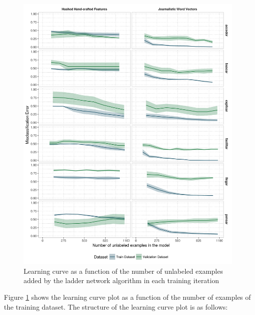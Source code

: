 \begin{figure}[htb!]
  \centering
  \includegraphics[height=.9\textheight,width=\textwidth,keepaspectratio]
    {plots/ladder/overfit_measure_per_examples}
  \caption{Learning curve as a function of the number of unlabeled examples
  added by the ladder network algorithm in each training iteration}
  \label{fig:ladder:overfit}
\end{figure}

Figure \ref{fig:ladder:overfit} shows the learning curve plot as a function of
the number of examples of the training dataset. The structure of the learning
curve plot is as follows:

